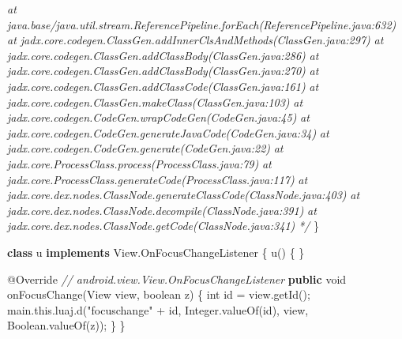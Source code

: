 \documentclass[
]{article}
\newenvironment{Shaded}{}{}
\newcommand{\AttributeTok}[1]{\textcolor[rgb]{0.49,0.56,0.16}{#1}}
\newcommand{\BuiltInTok}[1]{\textcolor[rgb]{0.00,0.50,0.00}{#1}}
\newcommand{\CommentTok}[1]{\textcolor[rgb]{0.38,0.63,0.69}{\textit{#1}}}
\newcommand{\DataTypeTok}[1]{\textcolor[rgb]{0.56,0.13,0.00}{#1}}
\newcommand{\FunctionTok}[1]{\textcolor[rgb]{0.02,0.16,0.49}{#1}}
\newcommand{\KeywordTok}[1]{\textcolor[rgb]{0.00,0.44,0.13}{\textbf{#1}}}
\newcommand{\NormalTok}[1]{#1}
\newcommand{\OperatorTok}[1]{\textcolor[rgb]{0.40,0.40,0.40}{#1}}
\newcommand{\StringTok}[1]{\textcolor[rgb]{0.25,0.44,0.63}{#1}}
\begin{document}
\begin{Shaded}
\begin{Highlighting}[]
\CommentTok{            	at java.base/java.util.stream.ReferencePipeline.forEach(ReferencePipeline.java:632)}
\CommentTok{            	at jadx.core.codegen.ClassGen.addInnerClsAndMethods(ClassGen.java:297)}
\CommentTok{            	at jadx.core.codegen.ClassGen.addClassBody(ClassGen.java:286)}
\CommentTok{            	at jadx.core.codegen.ClassGen.addClassBody(ClassGen.java:270)}
\CommentTok{            	at jadx.core.codegen.ClassGen.addClassCode(ClassGen.java:161)}
\CommentTok{            	at jadx.core.codegen.ClassGen.makeClass(ClassGen.java:103)}
\CommentTok{            	at jadx.core.codegen.CodeGen.wrapCodeGen(CodeGen.java:45)}
\CommentTok{            	at jadx.core.codegen.CodeGen.generateJavaCode(CodeGen.java:34)}
\CommentTok{            	at jadx.core.codegen.CodeGen.generate(CodeGen.java:22)}
\CommentTok{            	at jadx.core.ProcessClass.process(ProcessClass.java:79)}
\CommentTok{            	at jadx.core.ProcessClass.generateCode(ProcessClass.java:117)}
\CommentTok{            	at jadx.core.dex.nodes.ClassNode.generateClassCode(ClassNode.java:403)}
\CommentTok{            	at jadx.core.dex.nodes.ClassNode.decompile(ClassNode.java:391)}
\CommentTok{            	at jadx.core.dex.nodes.ClassNode.getCode(ClassNode.java:341)}
\CommentTok{            */}
    \OperatorTok{\}}

    \KeywordTok{class}\NormalTok{ u }\KeywordTok{implements} \BuiltInTok{View}\OperatorTok{.}\FunctionTok{OnFocusChangeListener} \OperatorTok{\{}
        \FunctionTok{u}\OperatorTok{()} \OperatorTok{\{}
        \OperatorTok{\}}

        \AttributeTok{@Override} \CommentTok{// android.view.View.OnFocusChangeListener}
        \KeywordTok{public} \DataTypeTok{void} \FunctionTok{onFocusChange}\OperatorTok{(}\BuiltInTok{View}\NormalTok{ view}\OperatorTok{,} \DataTypeTok{boolean}\NormalTok{ z}\OperatorTok{)} \OperatorTok{\{}
            \DataTypeTok{int}\NormalTok{ id }\OperatorTok{=}\NormalTok{ view}\OperatorTok{.}\FunctionTok{getId}\OperatorTok{();}
\NormalTok{            main}\OperatorTok{.}\FunctionTok{this}\OperatorTok{.}\FunctionTok{luaj}\OperatorTok{.}\FunctionTok{d}\OperatorTok{(}\StringTok{"focuschange"} \OperatorTok{+}\NormalTok{ id}\OperatorTok{,} \BuiltInTok{Integer}\OperatorTok{.}\FunctionTok{valueOf}\OperatorTok{(}\NormalTok{id}\OperatorTok{),}\NormalTok{ view}\OperatorTok{,} \BuiltInTok{Boolean}\OperatorTok{.}\FunctionTok{valueOf}\OperatorTok{(}\NormalTok{z}\OperatorTok{));}
        \OperatorTok{\}}
    \OperatorTok{\}}


\end{Highlighting}
\end{Shaded}
\end{document}
